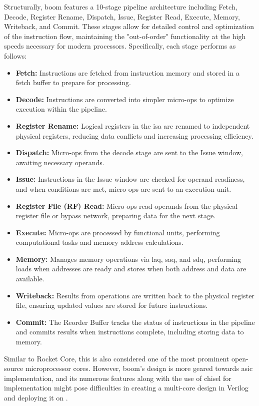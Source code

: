 Structurally, \acrshort{boom} features a 10-stage pipeline architecture including Fetch, Decode, Register Rename, Dispatch, Issue, Register Read, Execute, Memory, Writeback, and Commit. These stages allow for detailed control and optimization of the instruction flow, maintaining the "out-of-order" functionality at the high speeds necessary for modern processors. Specifically, each stage performs as follows:
\begin{itemize}
    \item \textbf{Fetch:} Instructions are fetched from instruction memory and stored in a fetch buffer to prepare for processing.
    \item \textbf{Decode:} Instructions are converted into simpler micro-ops to optimize execution within the pipeline.
    \item \textbf{Register Rename:} Logical registers in the \acrshort{isa} are renamed to independent physical registers, reducing data conflicts and increasing processing efficiency.
    \item \textbf{Dispatch:} Micro-ops from the decode stage are sent to the Issue window, awaiting necessary operands.
    \item \textbf{Issue:} Instructions in the Issue window are checked for operand readiness, and when conditions are met, micro-ops are sent to an execution unit.
    \item \textbf{Register File (RF) Read:} Micro-ops read operands from the physical register file or bypass network, preparing data for the next stage.
    \item \textbf{Execute:} Micro-ops are processed by functional units, performing computational tasks and memory address calculations.
    \item \textbf{Memory:} Manages memory operations via \acrfull{laq}, \acrfull{saq}, and \acrfull{sdq}, performing loads when addresses are ready and stores when both address and data are available.
    \item \textbf{Writeback:} Results from operations are written back to the physical register file, ensuring updated values are stored for future instructions.
    \item \textbf{Commit:} The Reorder Buffer tracks the status of instructions in the pipeline and commits results when instructions complete, including storing data to memory.
\end{itemize}

Similar to Rocket Core, this is also considered one of the most prominent open-source microprocessor cores. However, \acrshort{boom}'s design is more geared towards \acrshort{asic} implementation, and its numerous features along with the use of \acrshort{chisel} for implementation might pose difficulties in creating a multi-core design in Verilog and deploying it on .

